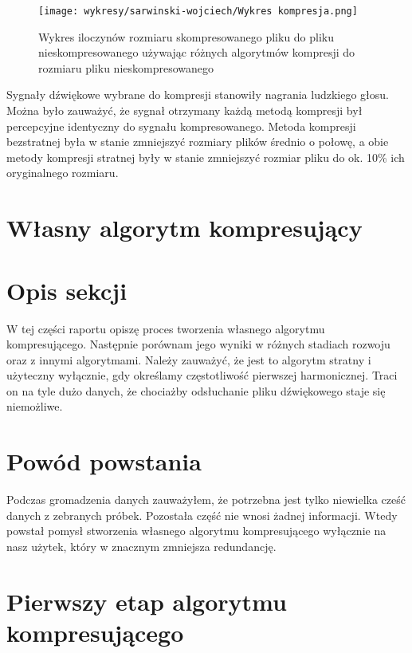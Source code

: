 \documentclass[a4paper,12pt]{extarticle}
\begin{document}
\begin{figure}[h!]
\centering
\texttt{[image: wykresy/sarwinski-wojciech/Wykres kompresja.png]}
\caption{Wykres iloczynów rozmiaru skompresowanego pliku do pliku nieskompresowanego używając różnych algorytmów kompresji do rozmiaru pliku nieskompresowanego}
\end{figure}

Sygnały dźwiękowe wybrane do kompresji stanowiły nagrania ludzkiego głosu. Można było zauważyć, że sygnał otrzymany każdą metodą kompresji był percepcyjne identyczny do sygnału kompresowanego. Metoda kompresji bezstratnej była w stanie zmniejszyć rozmiary plików średnio o połowę, a obie metody kompresji stratnej były w stanie zmniejszyć rozmiar pliku do ok. 10\% ich oryginalnego rozmiaru.

\newpage

\section{Własny algorytm kompresujący}
\label{sec:wlasny}

\section*{Opis sekcji}

W tej części raportu opiszę proces tworzenia własnego algorytmu kompresującego. Następnie porównam jego wyniki w różnych stadiach rozwoju oraz z innymi algorytmami. Należy zauważyć, że jest to algorytm stratny i użyteczny wyłącznie, gdy określamy częstotliwość pierwszej harmonicznej. Traci on na tyle dużo danych, że chociażby odsłuchanie pliku dźwiękowego staje się niemożliwe.

\section*{Powód powstania}

Podczas gromadzenia danych zauważyłem, że potrzebna jest tylko niewielka cześć danych z zebranych próbek. Pozostała część nie wnosi żadnej informacji. Wtedy powstał pomysł stworzenia własnego algorytmu kompresującego wyłącznie na nasz użytek, który w znacznym zmniejsza redundancję.

\section*{Pierwszy etap algorytmu kompresującego}
\end{document}
